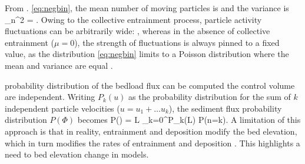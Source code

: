 From \DIFdelbegin {}\DIFdelend \DIFaddbegin {}\DIFaddend . \ref{eq:negbin}, the mean number of moving particles is 
\DIFdelbegin {}\DIFdelend \DIFaddbegin \be \langle {}\rangle \DIFadd{=\frac{ \lambda}{\alpha-\mu},}\ee
 \DIFaddend and the variance is
\be \sigma_n^2 = . \ee
Owing to the collective entrainment process, particle activity fluctuations can be arbitrarily wide: \DIFdelbegin {}\DIFdelend \DIFaddbegin {}\DIFaddend , whereas in the absence of collective entrainment ($\mu=0$), the strength of fluctuations is always pinned to a fixed value, \DIFaddbegin {}\DIFaddend as the distribution \DIFaddbegin {}\DIFaddend \ref{eq:negbin} limits to a Poisson distribution where the mean and variance are equal \DIFdelbegin {}\DIFdelend \DIFaddbegin {}\DIFaddend .

\DIFdelbegin {}\DIFdelend \DIFaddbegin {}\DIFaddend probability distribution of the bedload flux can be computed \DIFdelbegin {}\DIFdelend \DIFaddbegin {}\DIFaddend the control volume \DIFdelbegin {}\DIFdelend \DIFaddbegin {}\DIFaddend are independent.
Writing $P_k(u)$ as the probability distribution for the sum of $k$ independent particle velocities ($u=u_1+\dots u_k$), the sediment flux probability distribution $P(\Phi)$ becomes \DIFdelbegin {}\DIFdelend \DIFaddbegin {}\DIFaddend \be P(\Phi) = L \sum_{k=0}^\infty P_k(L\Phi) P(n=k). \ee
A limitation of this approach is that in reality, entrainment and deposition modify the bed elevation, which in turn modifies the rates of entrainment and deposition \citep{Sawai1987,Wong2007}. 
This highlights a need to \DIFdelbegin {}\DIFdelend \DIFaddbegin {}\DIFaddend bed elevation change in \DIFdelbegin {}\DIFdelend \DIFaddbegin {}\DIFaddend models.

